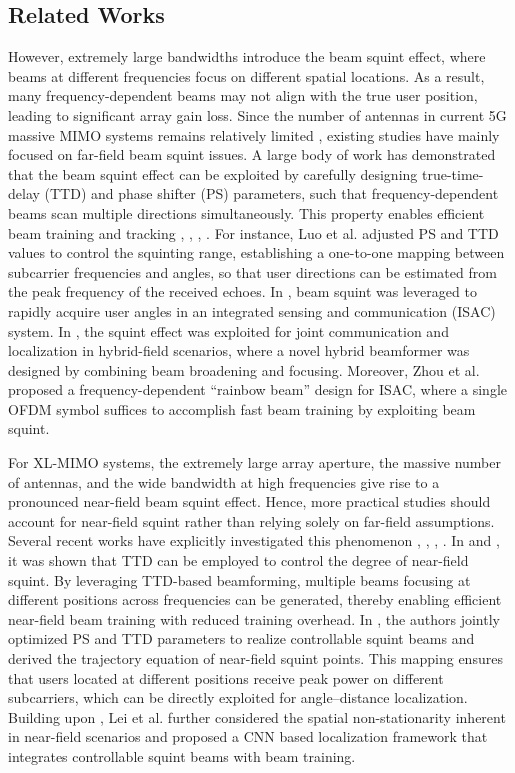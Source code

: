 \documentclass[lettersize,journal]{IEEEtran}
\begin{document}
\subsection{Related Works}
However, extremely large bandwidths introduce the beam squint effect, where beams at different frequencies focus on different spatial locations. As a result, many frequency-dependent beams may not align with the true user position, leading to significant array gain loss. Since the number of antennas in current 5G massive MIMO systems remains relatively limited \cite{10737444}, existing studies have mainly focused on far-field beam squint issues. A large body of work has demonstrated that the beam squint effect can be exploited by carefully designing true-time-delay (TTD) and phase shifter (PS) parameters, such that frequency-dependent beams scan multiple directions simultaneously. This property enables efficient beam training and tracking \cite{luo2024yolo}, \cite{10058989}, \cite{10886954}, \cite{zhou2025radar}. For instance, Luo et al. \cite{luo2024yolo} adjusted PS and TTD values to control the squinting range, establishing a one-to-one mapping between subcarrier frequencies and angles, so that user directions can be estimated from the peak frequency of the received echoes. In \cite{10058989}, beam squint was leveraged to rapidly acquire user angles in an integrated sensing and communication (ISAC) system. In \cite{10886954}, the squint effect was exploited for joint communication and localization in hybrid-field scenarios, where a novel hybrid beamformer was designed by combining beam broadening and focusing. Moreover, Zhou et al. \cite{zhou2025radar} proposed a frequency-dependent “rainbow beam” design for ISAC, where a single OFDM symbol suffices to accomplish fast beam training by exploiting beam squint.

For XL-MIMO systems, the extremely large array aperture, the massive number of antennas, and the wide bandwidth at high frequencies give rise to a pronounced near-field beam squint effect. Hence, more practical studies should account for near-field squint rather than relying solely on far-field assumptions. Several recent works have explicitly investigated this phenomenon \cite{cui2022near2}, \cite{zheng2024near}, \cite{luo2023beam}, \cite{lei2024deep}. In \cite{cui2022near2} and \cite{zheng2024near}, it was shown that TTD can be employed to control the degree of near-field squint. By leveraging TTD-based beamforming, multiple beams focusing at different positions across frequencies can be generated, thereby enabling efficient near-field beam training with reduced training overhead. In \cite{luo2023beam}, the authors jointly optimized PS and TTD parameters to realize controllable squint beams and derived the trajectory equation of near-field squint points. This mapping ensures that users located at different positions receive peak power on different subcarriers, which can be directly exploited for angle–distance localization. Building upon \cite{luo2023beam}, Lei et al. \cite{lei2024deep} further considered the spatial non-stationarity inherent in near-field scenarios and proposed a CNN based localization framework that integrates controllable squint beams with beam training.
\end{document}
